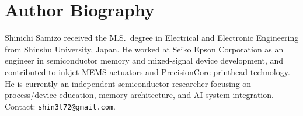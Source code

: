 \documentclass[conference]{IEEEtran}
\begin{document}
\section*{Author Biography}
Shinichi Samizo received the M.S.\ degree in Electrical and Electronic Engineering from Shinshu University, Japan. He worked at Seiko Epson Corporation as an engineer in semiconductor memory and mixed-signal device development, and contributed to inkjet MEMS actuators and PrecisionCore printhead technology. He is currently an independent semiconductor researcher focusing on process/device education, memory architecture, and AI system integration. Contact: \texttt{shin3t72@gmail.com}.
\end{document}
